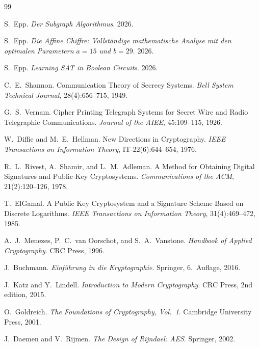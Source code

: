 ﻿\documentclass[a4paper,12pt]{scrreprt}
\theoremstyle{definition}
\begin{document}
\begin{thebibliography}{99}

S.\ Epp. \textit{Der Subgraph Algorithmus}. 2026.

S.\ Epp. \textit{Die Affine Chiffre: Vollst\"andige mathematische Analyse mit den optimalen Parametern $a=15$ und $b=29$}. 2026.

S.\ Epp. \textit{Learning SAT in Boolean Circuits}. 2026.

C.\ E.\ Shannon. Communication Theory of Secrecy Systems. \textit{Bell System Technical Journal}, 28(4):656--715, 1949.

G.\ S.\ Vernam. Cipher Printing Telegraph Systems for Secret Wire and Radio Telegraphic Communications. \textit{Journal of the AIEE}, 45:109--115, 1926.

W.\ Diffie and M.\ E.\ Hellman. New Directions in Cryptography. \textit{IEEE Transactions on Information Theory}, IT-22(6):644--654, 1976.

R.\ L.\ Rivest, A.\ Shamir, and L.\ M.\ Adleman. A Method for Obtaining Digital Signatures and Public-Key Cryptosystems. \textit{Communications of the ACM}, 21(2):120--126, 1978.

T.\ ElGamal. A Public Key Cryptosystem and a Signature Scheme Based on Discrete Logarithms. \textit{IEEE Transactions on Information Theory}, 31(4):469--472, 1985.

A.\ J.\ Menezes, P.\ C.\ van Oorschot, and S.\ A.\ Vanstone. \textit{Handbook of Applied Cryptography}. CRC Press, 1996.

J.\ Buchmann. \textit{Einf\"uhrung in die Kryptographie}. Springer, 6.\ Auflage, 2016.

J.\ Katz and Y.\ Lindell. \textit{Introduction to Modern Cryptography}. CRC Press, 2nd edition, 2015.

O.\ Goldreich. \textit{The Foundations of Cryptography, Vol.\ 1}. Cambridge University Press, 2001.

J.\ Daemen and V.\ Rijmen. \textit{The Design of Rijndael: AES}. Springer, 2002.


\end{thebibliography}
\end{document}
